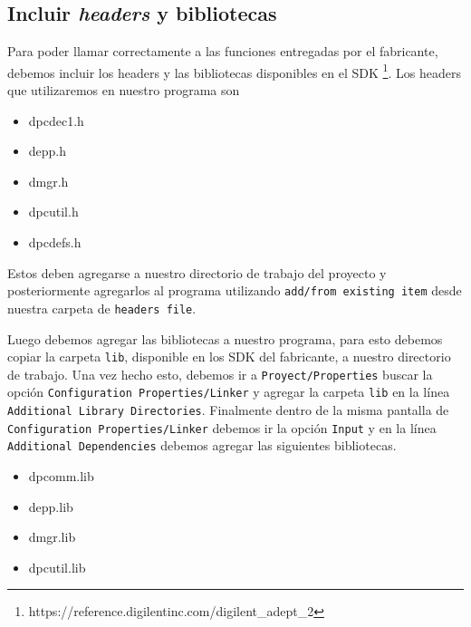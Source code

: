 \documentclass[11pt,letterpaper,spanish]{article}
\begin{document}
\subsection{Incluir \textit{headers} y bibliotecas}
Para poder llamar correctamente a las funciones entregadas por el fabricante, debemos incluir los headers y las bibliotecas disponibles en el SDK \footnote{https://reference.digilentinc.com/digilent\_adept\_2}. Los headers que utilizaremos en nuestro programa son 
\begin{itemize}
\item dpcdec1.h
\item depp.h
\item dmgr.h
\item dpcutil.h
\item dpcdefs.h
\end{itemize}
Estos deben agregarse a nuestro directorio de trabajo del proyecto y posteriormente agregarlos al programa utilizando \verb+add/from existing item+ desde nuestra carpeta de \verb+headers file+.

Luego debemos agregar las bibliotecas a nuestro programa, para esto debemos copiar la carpeta \verb+lib+, disponible en los SDK del fabricante, a nuestro directorio de trabajo. Una vez hecho esto, debemos ir a \verb+Proyect/Properties+ buscar la opción \verb+Configuration Properties/Linker+ y agregar la carpeta \verb+lib+ en la línea \verb+Additional Library Directories+. 
Finalmente dentro de la misma pantalla de \verb+Configuration Properties/Linker+ debemos ir la opción \verb+Input+ y en la línea \verb+Additional Dependencies+ debemos agregar las siguientes bibliotecas.

\begin{itemize}
\item dpcomm.lib
\item depp.lib
\item dmgr.lib
\item dpcutil.lib
\end{itemize}
\end{document}

